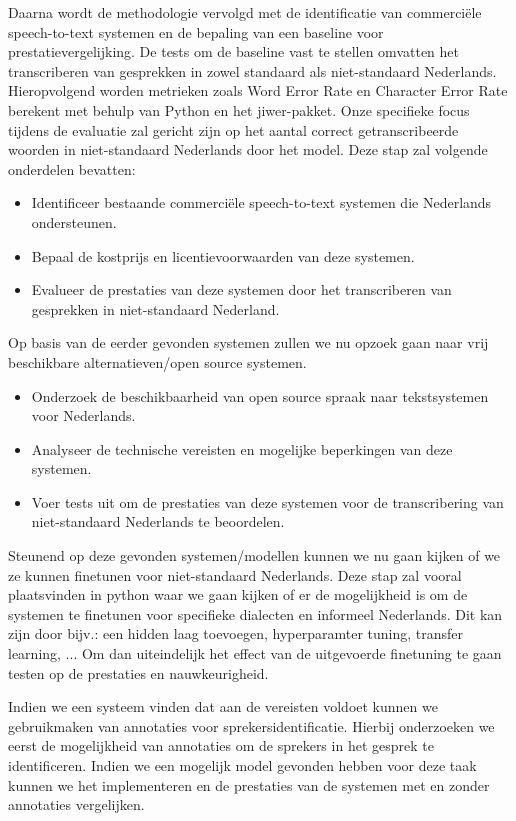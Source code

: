 \par Daarna wordt de methodologie vervolgd met de identificatie van commerciële speech-to-text systemen en de bepaling van een baseline voor prestatievergelijking. De tests om de baseline vast te stellen omvatten het transcriberen van gesprekken in zowel standaard als niet-standaard Nederlands. Hieropvolgend worden metrieken zoals Word Error Rate en Character Error Rate berekent met behulp van Python en het jiwer-pakket. Onze specifieke focus tijdens de evaluatie zal gericht zijn op het aantal correct getranscribeerde woorden in niet-standaard Nederlands door het model.
Deze stap zal volgende onderdelen bevatten:
\begin{itemize}
    \item Identificeer bestaande commerciële speech-to-text systemen die Nederlands ondersteunen.
    \item Bepaal de kostprijs en licentievoorwaarden van deze systemen.
    \item Evalueer de prestaties van deze systemen door het transcriberen van gesprekken in niet-standaard Nederland.
\end{itemize}   
\par Op basis van de eerder gevonden systemen zullen we nu opzoek gaan naar vrij beschikbare alternatieven/open source systemen.
\begin{itemize}
    \item Onderzoek de beschikbaarheid van open source spraak naar tekstsystemen voor Nederlands.
    \item Analyseer de technische vereisten en mogelijke beperkingen van deze systemen.
    \item Voer tests uit om de prestaties van deze systemen voor de transcribering van niet-standaard Nederlands te beoordelen.
\end{itemize}
\par Steunend op deze gevonden systemen/modellen kunnen we nu gaan kijken of we ze kunnen finetunen voor niet-standaard Nederlands. Deze stap zal vooral plaatsvinden in python waar we gaan kijken of er de mogelijkheid is om de systemen te finetunen voor specifieke dialecten en informeel Nederlands. Dit kan zijn door bijv.: een hidden laag toevoegen, hyperparamter tuning, transfer learning, ... Om dan uiteindelijk het effect van de uitgevoerde finetuning te gaan testen op de prestaties en nauwkeurigheid.

\par Indien we een systeem vinden dat aan de vereisten voldoet kunnen we gebruikmaken van annotaties voor sprekersidentificatie. Hierbij onderzoeken we eerst de mogelijkheid van annotaties om de sprekers in het gesprek te identificeren. Indien we een mogelijk model gevonden hebben voor deze taak kunnen we het implementeren en de prestaties van de systemen met en zonder annotaties vergelijken.

